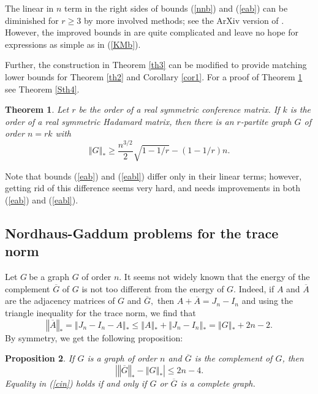 \documentclass[12pt]{article}%
\newtheorem{theorem}{Theorem}[section]
\newtheorem{proposition}[theorem]{Proposition}
\begin{document}
The linear in $n$ term in the right sides of bounds (\ref{nnb}) and
(\ref{eab}) can be diminished for $r\geq3$ by more involved methods; see the
ArXiv version of \cite{Nik15a}. However, the improved bounds in \cite{Nik15a}
are quite complicated and leave no hope for expressions as simple as in
(\ref{KMb}).\medskip

Further, the construction in Theorem \ref{th3} can be modified to provide
matching lower bounds for Theorem \ref{th2} and Corollary \ref{cor1}. For a
proof of Theorem \ref{th4} see Theorem \ref{Sth4}.

\begin{theorem}
\label{th4}Let $r$ be the order of a real symmetric conference matrix. If $k$
is the order of a real symmetric Hadamard matrix, then there is an $r$-partite
graph $G$ of order $n=rk$ with
\begin{equation}
\left\Vert G\right\Vert _{\ast}\geq\frac{n^{3/2}}{2}\sqrt{1-1/r}-\left(
1-1/r\right)  n. \label{eabl}%
\end{equation}

\end{theorem}

Note that bounds (\ref{eab}) and (\ref{eabl}) differ only in their linear
terms; however, getting rid of this difference seems very hard, and needs
improvements in both (\ref{eab}) and (\ref{eabl}).

\subsection{\label{NGtr}Nordhaus-Gaddum problems for the trace norm}

Let $G\ $be a graph $G$ of order $n.$ It seems not widely known that the
energy of the complement $\overline{G}$ of $G$ is not too different from the
energy of $G$. Indeed, if $A$ and $\overline{A}$ are the adjacency matrices of
$G$ and $\overline{G},$ then $A+\overline{A}=J_{n}-I_{n}$ and using the
triangle inequality for the trace norm, we find that%
\[
\left\Vert \overline{A}\right\Vert _{\ast}=\left\Vert J_{n}-I_{n}-A\right\Vert
_{\ast}\leq\left\Vert A\right\Vert _{\ast}+\left\Vert J_{n}-I_{n}\right\Vert
_{\ast}=\left\Vert G\right\Vert _{\ast}+2n-2.
\]
By symmetry, we get the following proposition:

\begin{proposition}
If $G$ is a graph of order $n$ and $\overline{G}$ is the complement of $G$,
then
\begin{equation}
\left\vert \left\Vert \overline{G}\right\Vert _{\ast}-\left\Vert G\right\Vert
_{\ast}\right\vert \leq2n-4. \label{cin}%
\end{equation}
Equality in (\ref{cin}) holds if and only if $G$ or $\overline{G}$ is a
complete graph.
\end{proposition}
\end{document}
